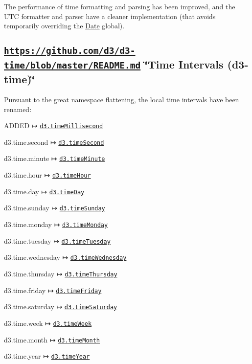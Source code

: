 The performance of time formatting and parsing has been improved, and the U\+TC formatter and parser have a cleaner implementation (that avoids temporarily overriding the \mbox{\hyperlink{classDate}{Date}} global).

\subsection*{\href{https://github.com/d3/d3-time/blob/master/README.md}{\tt https\+://github.\+com/d3/d3-\/time/blob/master/\+R\+E\+A\+D\+M\+E.\+md} \char`\"{}\+Time Intervals (d3-\/time)\char`\"{}}

Pursuant to the great namespace flattening, the local time intervals have been renamed\+:


\begin{DoxyItemize}
\item A\+D\+D\+ED ↦ \href{https://github.com/d3/d3-time/blob/master/README.md#timeMillisecond}{\tt d3.\+time\+Millisecond}
\item d3.\+time.\+second ↦ \href{https://github.com/d3/d3-time/blob/master/README.md#timeSecond}{\tt d3.\+time\+Second}
\item d3.\+time.\+minute ↦ \href{https://github.com/d3/d3-time/blob/master/README.md#timeMinute}{\tt d3.\+time\+Minute}
\item d3.\+time.\+hour ↦ \href{https://github.com/d3/d3-time/blob/master/README.md#timeHour}{\tt d3.\+time\+Hour}
\item d3.\+time.\+day ↦ \href{https://github.com/d3/d3-time/blob/master/README.md#timeDay}{\tt d3.\+time\+Day}
\item d3.\+time.\+sunday ↦ \href{https://github.com/d3/d3-time/blob/master/README.md#timeSunday}{\tt d3.\+time\+Sunday}
\item d3.\+time.\+monday ↦ \href{https://github.com/d3/d3-time/blob/master/README.md#timeMonday}{\tt d3.\+time\+Monday}
\item d3.\+time.\+tuesday ↦ \href{https://github.com/d3/d3-time/blob/master/README.md#timeTuesday}{\tt d3.\+time\+Tuesday}
\item d3.\+time.\+wednesday ↦ \href{https://github.com/d3/d3-time/blob/master/README.md#timeWednesday}{\tt d3.\+time\+Wednesday}
\item d3.\+time.\+thursday ↦ \href{https://github.com/d3/d3-time/blob/master/README.md#timeThursday}{\tt d3.\+time\+Thursday}
\item d3.\+time.\+friday ↦ \href{https://github.com/d3/d3-time/blob/master/README.md#timeFriday}{\tt d3.\+time\+Friday}
\item d3.\+time.\+saturday ↦ \href{https://github.com/d3/d3-time/blob/master/README.md#timeSaturday}{\tt d3.\+time\+Saturday}
\item d3.\+time.\+week ↦ \href{https://github.com/d3/d3-time/blob/master/README.md#timeWeek}{\tt d3.\+time\+Week}
\item d3.\+time.\+month ↦ \href{https://github.com/d3/d3-time/blob/master/README.md#timeMonth}{\tt d3.\+time\+Month}
\item d3.\+time.\+year ↦ \href{https://github.com/d3/d3-time/blob/master/README.md#timeYear}{\tt d3.\+time\+Year}
\end{DoxyItemize}

